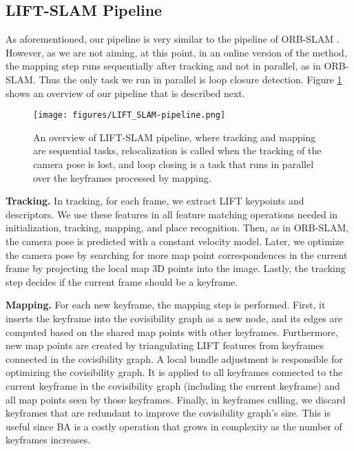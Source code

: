 \subsection{LIFT-SLAM Pipeline}

As aforementioned, our pipeline is very similar to the pipeline of ORB-SLAM \cite{orb-slam}. However, as we are not aiming, at this point, in an online version of the method, the mapping step runs sequentially after tracking and not in parallel, as in ORB-SLAM. Thus the only task we run in parallel is loop closure detection. Figure \ref{fig:lift-slam-pipeline} shows an overview of our pipeline that is described next.

\begin{figure}
\centerline{\texttt{[image: figures/LIFT\_SLAM-pipeline.png]}}
\caption[LIFT-SLAM pipeline.]{An overview of LIFT-SLAM pipeline, where tracking and mapping are sequential tasks, relocalization is called when the tracking of the camera pose is lost, and loop closing is a task that runs in parallel over the keyframes processed by mapping.}
\label{fig:lift-slam-pipeline}
\end{figure}

\textbf{Tracking.} In tracking, for each frame, we extract LIFT keypoints and descriptors. We use these features in all feature matching operations needed in initialization, tracking, mapping, and place recognition. Then, as in ORB-SLAM, the camera pose is predicted with a constant velocity model. Later, we optimize the camera pose by searching for more map point correspondences in the current frame by projecting the local map 3D points into the image. Lastly, the tracking step decides if the current frame should be a keyframe.

\textbf{Mapping.} For each new keyframe, the mapping step is performed. First, it inserts the keyframe into the covisibility graph as a new node, and its edges are computed based on the shared map points with other keyframes. Furthermore, new map points are created by triangulating LIFT features from keyframes connected in the covisibility graph. A local bundle adjustment is responsible for optimizing the covisibility graph. It is applied to all keyframes connected to the current keyframe in the covisibility graph (including the current keyframe) and all map points seen by those keyframes. Finally, in keyframes culling, we discard keyframes that are redundant to improve the covisibility graph's size. This is useful since BA is a costly operation that grows in complexity as the number of keyframes increases. 

